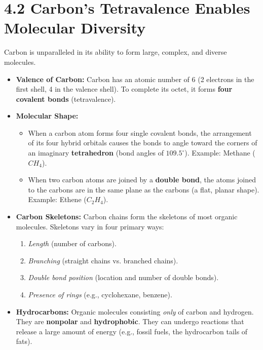 \documentclass[11pt, a4paper]{article}
\begin{document}
\section*{4.2 Carbon's Tetravalence Enables Molecular Diversity}
Carbon is unparalleled in its ability to form large, complex, and diverse molecules.
\begin{itemize}
    \item \textbf{Valence of Carbon:} Carbon has an atomic number of 6 (2 electrons in the first shell, 4 in the valence shell). To complete its octet, it forms \textbf{four covalent bonds} (tetravalence).
    \item \textbf{Molecular Shape:} 
    \begin{itemize}
        \item When a carbon atom forms four single covalent bonds, the arrangement of its four hybrid orbitals causes the bonds to angle toward the corners of an imaginary \textbf{tetrahedron} (bond angles of $109.5^\circ$). Example: Methane ($CH_4$).
        \item When two carbon atoms are joined by a \textbf{double bond}, the atoms joined to the carbons are in the same plane as the carbons (a flat, planar shape). Example: Ethene ($C_2H_4$).
    \end{itemize}
    \item \textbf{Carbon Skeletons:} Carbon chains form the skeletons of most organic molecules. Skeletons vary in four primary ways:
    \begin{enumerate}
        \item \textit{Length} (number of carbons).
        \item \textit{Branching} (straight chains vs. branched chains).
        \item \textit{Double bond position} (location and number of double bonds).
        \item \textit{Presence of rings} (e.g., cyclohexane, benzene).
    \end{enumerate}
    \item \textbf{Hydrocarbons:} Organic molecules consisting \textit{only} of carbon and hydrogen. They are \textbf{nonpolar} and \textbf{hydrophobic}. They can undergo reactions that release a large amount of energy (e.g., fossil fuels, the hydrocarbon tails of fats).
\end{itemize}
\end{document}
